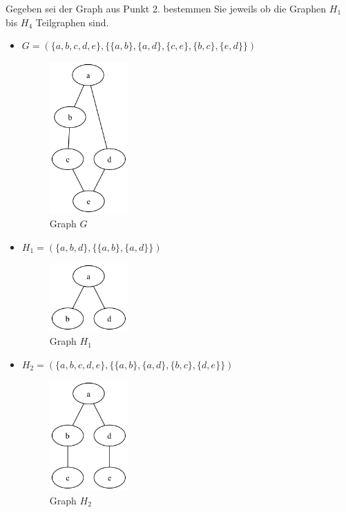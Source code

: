 \documentclass[a4paper,11pt]{report}
\begin{document}
Gegeben sei der Graph aus Punkt 2. bestemmen Sie jeweils ob die Graphen $H_1$ bis $H_4$ Teilgraphen sind.
\begin{itemize}
    \item $G = (\{a, b, c, d, e\}, \{\{a, b\}, \{a, d\}, \{c, e\}, \{b, c\}, \{e, d\}\})$
    \begin{figure}[htbp]
        \centering
        \includegraphics[width=3cm]{notebook/assets/aufgabe_02_graph.png}
        \caption{Graph $G$}
        \label{fig:graph_h_1}
    \end{figure}
    \item $H_1 = (\{ a, b, d\}, \{ \{a, b\}, \{a, d\}\})$ 
    \begin{figure}[htbp]
        \centering
        \includegraphics[width=3cm]{notebook/assets/aufgabe_04_h1.png}
        \caption{Graph $H_1$}
        \label{fig:graph_h_1}
    \end{figure}
    \item $H_2 = (\{ a, b, c, d, e\}, \{ \{a, b\}, \{a, d\}, \{b, c\}, \{d, e\}\})$
    \begin{figure}[htbp]
        \centering
        \includegraphics[width=3cm]{notebook/assets/aufgabe_04_h2.png}
        \caption{Graph $H_2$}
        \label{fig:graph_h_2}
    \end{figure}

\end{itemize}
\end{document}
